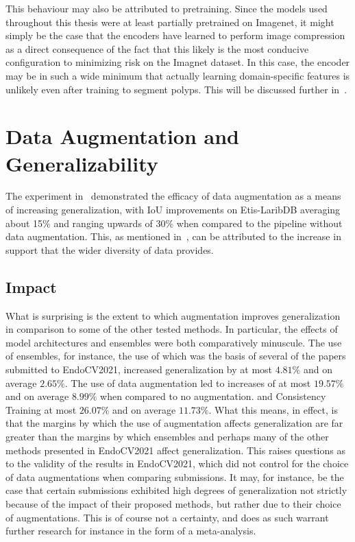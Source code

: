 This behaviour may also be attributed to pretraining. Since the models used throughout this thesis were at least partially pretrained on Imagenet, it might simply be the case that the encoders have learned to perform image compression as a direct consequence of the fact that this likely is the most conducive configuration to minimizing risk on the Imagnet dataset. In this case, the encoder may be in such a wide minimum that actually learning domain-specific features is unlikely even after training to segment polyps. This will be discussed further in~.


\section{Data Augmentation and Generalizability}
The experiment in~ demonstrated the efficacy of data augmentation as a means of increasing generalization, with IoU improvements on Etis-LaribDB averaging about 15\% and ranging upwards of 30\% when compared to the pipeline without data augmentation. This, as mentioned in~, can be attributed to the increase in support that the wider diversity of data provides. 

\subsection{Impact}

What is surprising is the extent to which augmentation improves generalization in comparison to some of the other tested methods. In particular, the effects of model architectures and ensembles were both comparatively minuscule. The use of ensembles, for instance, the use of which was the basis of several of the papers submitted to EndoCV2021, increased generalization by at most \(4.81\%\) and on average \(2.65\%\).  The use of data augmentation led to increases of at most \(19.57 \%\) and on average \(8.99\%\) when compared to no augmentation. and Consistency Training at most \(26.07\%\) and on average \(11.73\%\). What this means, in effect, is that the margins by which the use of augmentation affects generalization are far greater than the margins by which ensembles and perhaps many of the other methods presented in EndoCV2021 affect generalization. This raises questions as to the validity of the results in EndoCV2021, which did not control for the choice of data augmentations when comparing submissions. It may, for instance, be the case that certain submissions exhibited high degrees of generalization not strictly because of the impact of their proposed methods, but rather due to their choice of augmentations. This is of course not a certainty, and does as such warrant further research for instance in the form of a meta-analysis. 

